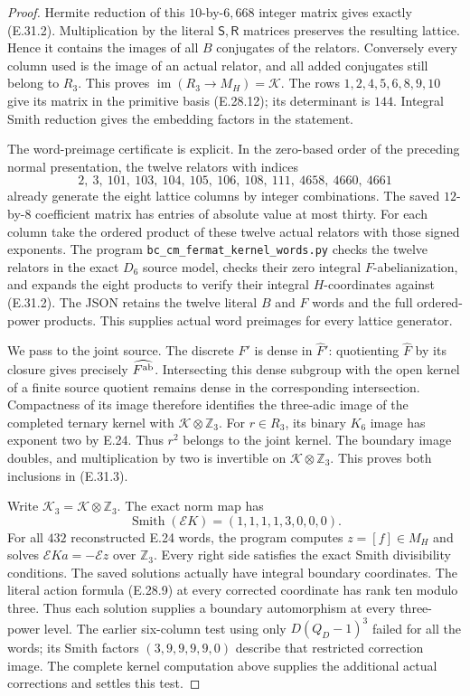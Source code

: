 \begin{proof}
Hermite reduction of this $10$-by-$6,668$ integer
matrix gives exactly (E.31.2).  Multiplication by
the literal $\mathsf S,\mathsf R$ matrices preserves
the resulting lattice.  Hence it contains the
images of all $B$ conjugates of the relators.
Conversely every column used is the image of an
actual relator, and all added conjugates still
belong to $R_3$.  This proves
$\operatorname{im}(R_3\to M_H)=\mathcal K$.
The rows $1,2,4,5,6,8,9,10$ give its matrix in the
primitive basis (E.28.12); its determinant is $144$.
Integral Smith reduction gives the embedding factors
in the statement.

The word-preimage certificate is explicit.  In the
zero-based order of the preceding normal presentation,
the twelve relators with indices
\[
 2,\ 3,\ 101,\ 103,\ 104,\ 105,\ 106,\ 108,\ 111,\
 4658,\ 4660,\ 4661
 \tag{E.31.8}
\]
already generate the eight lattice columns by integer
combinations.  The saved $12$-by-$8$ coefficient
matrix has entries of absolute value at most thirty.
For each column take the ordered product of these
twelve actual relators with those signed exponents.
The program
\texttt{bc\_cm\_fermat\_kernel\_words.py}
checks the twelve relators in the exact $D_6$ source
model, checks their zero integral $F$-abelianization,
and expands the eight products to verify their
integral $H$-coordinates against (E.31.2).
The JSON retains the twelve literal $B$ and $F$
words and the full ordered-power products.  This
supplies actual word preimages for every lattice
generator.

We pass to the joint source.  The discrete $F'$ is
dense in $\widehat F'$: quotienting $\widehat F$
by its closure gives precisely
$\widehat{F^{\rm ab}}$.  Intersecting this dense
subgroup with the open kernel of a finite source
quotient remains dense in the corresponding
intersection.  Compactness of its image therefore
identifies the three-adic image of the completed
ternary kernel with $\mathcal K\otimes\mathbb Z_3$.
For $r\in R_3$, its binary $K_6$ image has exponent
two by E.24.  Thus $r^2$ belongs to the joint kernel.
The boundary image doubles, and multiplication by
two is invertible on $\mathcal K\otimes\mathbb Z_3$.
This proves both inclusions in (E.31.3).

Write $\mathcal K_3=\mathcal K\otimes\mathbb Z_3$.
The exact norm map has
\[
 \operatorname{Smith}(\mathcal E K)
                     =(1,1,1,1,3,0,0,0).
 \tag{E.31.9}
\]
For all $432$ reconstructed E.24 words, the program
computes $z=[f]\in M_H$ and solves
$\mathcal E K a=-\mathcal E z$ over $\mathbb Z_3$.
Every right side satisfies the exact Smith
divisibility conditions.  The saved solutions
actually have integral boundary coordinates.
The literal action formula (E.28.9) at every
corrected coordinate has rank ten modulo three.
Thus each solution supplies a boundary
automorphism at every three-power level.
The earlier six-column test using only
$D(Q_D-1)^3$ failed for all the words; its
Smith factors $(3,9,9,9,9,0)$ describe that
restricted correction image.  The complete
kernel computation above supplies the additional
actual corrections and settles this test.


\end{proof}

